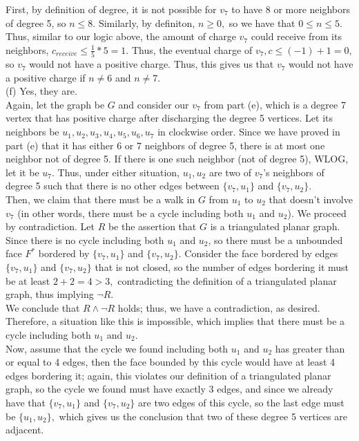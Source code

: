 \documentclass{article}
\begin{document}
\indent First, by definition of degree, it is not possible for $v_7$ to have 8 or more neighbors of degree 5, so $n\leq8.$ Similarly, by definiton, $n\geq0,$ so we have that $0\leq n\leq 5.$ Thus, similar to our logic above, the amount of charge $v_7$ could receive from its neighbors, $c_{receive}\leq\frac{1}{5} * 5 = 1.$ Thus, the eventual charge of $v_7, c\leq (-1) + 1 = 0,$ so $v_7$ would not have a positive charge. Thus, this gives us that $v_7$ would not have a positive charge if $n\neq6$ and $n\neq7.$ \\[.5cm]
(f) Yes, they are.\\[.3cm]
\indent Again, let the graph be $G$ and consider our $v_7$ from part (e), which is a degree 7 vertex that has positive charge after discharging the degree 5 vertices. Let its neighbors be $u_1, u_2, u_3, u_4, u_5, u_6, u_7$ in clockwise order. Since we have proved in part (e) that it has either 6 or 7 neighbors of degree 5, there is at most one neighbor not of degree 5. If there is one such neighbor (not of degree 5), WLOG, let it be $u_7.$ Thus, under either situation, $u_1, u_2$ are two of $v_7$'s neighbors of degree 5 such that there is no other edges between $\{v_7, u_1\}$ and $\{v_7, u_2\}.$ \\[.1cm]
\indent Then, we claim that there must be a walk in $G$ from $u_1$ to $u_2$ that doesn't involve $v_7$ (in other words, there must be a cycle including both $u_1$ and $u_2$). We proceed by contradiction. Let $R$ be the assertion that $G$ is a triangulated planar graph. \\[.1cm]
\indent Since there is no cycle including both $u_1$ and $u_2$, so there must be a unbounded face $F^*$ bordered by $\{v_7, u_1\}$ and $\{v_7, u_2\}.$ Consider the face bordered by edges $\{v_7, u_1\}$ and $\{v_7, u_2\}$ that is not closed, so the number of edges bordering it must be at least $2 + 2 = 4 > 3,$ contradicting the definition of a triangulated planar graph, thus implying $\neg R.$ \\[.1cm]
\indent We conclude that $R\land\neg R$ holds; thus, we have a contradiction, as desired. Therefore, a situation like this is impossible, which implies that there must be a cycle including both $u_1$ and $u_2.$ \\[.1cm]
\indent Now, assume that the cycle we found including both $u_1$ and $u_2$ has greater than or equal to 4 edges, then the face bounded by this cycle would have at least 4 edges bordering it; again, this violates our definition of a triangulated planar graph, so the cycle we found must have exactly 3 edges, and since we already have that $\{v_7, u_1\}$ and $\{v_7, u_2\}$ are two edges of this cycle, so the last edge must be $\{u_1, u_2\},$ which gives us the conclusion that two of these degree 5 vertices are adjacent. \\[.1cm]
\end{document}

